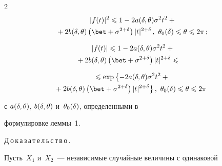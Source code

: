 \begin{multicols}{2}
\begin{multline}
\label{Ocenka|f(t)|^2obwaja}

|f(t)|^2\le 1-2a(\d,\theta)\sigma^2t^2+{}\\

\!\!\!\!{}+ 2b(\d,\theta)\left(\bet+

\sigma^{2+\d}\right)|t|^{2+\d}\,,\ \theta_0(\d)\le\theta\le2\pi\,;\!\!

\end{multline}



\vspace*{-8pt}



\noindent

\begin{multline}

|f(t)|\le1 -2a(\d,\theta)\sigma^2t^2+{}\\

{}+2b(\d,\theta)\left(\bet+

\sigma^{2+\d}\right)|t|^{2+\d}\le{}\ \ \ \

\label{Ocenka|f(t)|obwaja}

\end{multline}



\vspace*{-12pt}



\noindent

\begin{multline}

\le \exp\left\{-2a(\d,\theta)\sigma^2t^2+{}\right.\\

\!\!\!\!\!\!\!\!\left.{}+2b(\d,\theta)\left(\bet+

\sigma^{2+\d}\right)|t|^{2+\d}\right\},\

\theta_0(\d)\le\theta\le2\pi \!\!\!

\label{OcenkaLn|f(t)|obwaja}

\end{multline}

с $a(\delta,\theta)$, $b(\delta,\theta)$ и~$\theta_0(\delta)$, определенными в

формулировке леммы~1.



\medskip



Д\,о\,к\,а\,з\,а\,т\,е\,л\,ь\,с\,т\,в\,о\,.\

Пусть~$X_1$ и~$X_2$~--- независимые случайные величины с одинаковой


\end{multicols}
